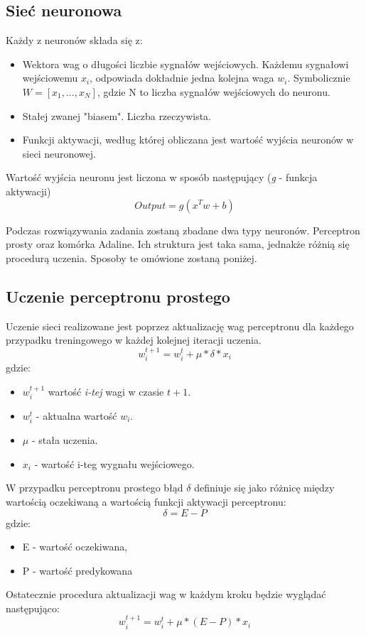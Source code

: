 \documentclass{article}
\begin{document}
	\subsection{Sieć neuronowa}
	Każdy z neuronów składa się z: 
	\begin{itemize}
		\item Wektora wag o długości liczbie sygnałów wejściowych. Każdemu sygnałowi wejściowemu $x_i$, odpowiada dokładnie jedna kolejna waga $w_i$. Symbolicznie $W = [x_1, ..., x_N]$, gdzie N to liczba sygnałów wejściowych do neuronu.
		\item Stałej zwanej "biasem". Liczba rzeczywista.
		\item Funkcji aktywacji, według której obliczana jest wartość wyjścia neuronów w sieci neuronowej.
	\end{itemize}
    Wartość wyjścia neuronu jest liczona w sposób następujący (\textit{g} - funkcja aktywacji)
    \begin{equation}
    		Output = g(x^Tw + b)
    \end{equation}
    
    Podczas rozwiązywania zadania zostaną zbadane dwa typy neuronów. Perceptron prosty oraz komórka Adaline. Ich struktura jest taka sama, jednakże różnią się procedurą uczenia. Sposoby te omówione zostaną poniżej.
    
    \newpage
    \subsection{Uczenie perceptronu prostego}
    Uczenie sieci realizowane jest poprzez aktualizację wag perceptronu dla każdego przypadku treningowego w każdej kolejnej iteracji uczenia. 
    \begin{equation}
    w_i^{t+1} = w_i^t + \mu * \delta * x_i
    \end{equation}
    gdzie:
    \begin{itemize}
        \item $w_i^{t+1}$ wartość \textit{i-tej} wagi w czasie $t+1$.
        \item $w_i^t$ - aktualna wartość $w_i$.
        \item $\mu$ - stała uczenia.
        \item $x_i$ - wartość i-teg wygnału wejściowego.
    \end{itemize}
    
    W przypadku perceptronu prostego błąd $\delta$ definiuje się jako różnicę między wartością oczekiwaną a wartością funkcji aktywacji perceptronu:
    \begin{equation}
    \delta = E - P
    \end{equation}
    gdzie:
    \begin{itemize}
    	\item E - wartość oczekiwana,
    	\item P - wartość predykowana
    \end{itemize}
    Ostatecznie procedura aktualizacji wag w każdym kroku będzie wyglądać następująco:
     \begin{equation}
        w_i^{t+1} = w_i^t + \mu * (E-P) * x_i
     \end{equation}
    
\end{document}
